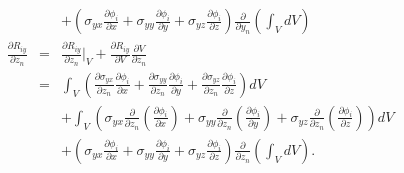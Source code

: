 \begin{eqnarray}
&& + \left(  \sigma_{yx} \frac{\partial \phi_i}{\partial x} + \sigma_{yy} \frac{\partial \phi_i}{\partial y} + \sigma_{yz} \frac{\partial \phi_i}{\partial z} \right) \frac{\partial}{\partial y_n} \left(\int_V dV \right) \nonumber\\
\frac{\partial R_{iy}}{\partial z_n} &=& \frac{\partial R_{iy}}{\partial z_n} \bigg |_V + \frac{\partial R_{iy}}{\partial V} \frac{\partial V}{\partial z_n} \nonumber\\
&=& \int_V \left(\frac{\partial \sigma_{yx}}{\partial z_n}\frac{\partial \phi_i}{\partial x} +\frac{\partial \sigma_{yy}}{\partial z_n} \frac{\partial \phi_i}{\partial y} + \frac{\partial \sigma_{yz}}{\partial z_n}\frac{\partial \phi_i}{\partial z}  \right) dV \nonumber\\
&&+ \int_V \left(\sigma_{yx} \frac{\partial}{\partial z_n} \left(\frac{\partial \phi_i}{\partial x}\right)+ \sigma_{yy} \frac{\partial}{\partial z_n} \left(\frac{\partial \phi_i}{\partial y}\right) + \sigma_{yz} \frac{\partial}{\partial z_n} \left(\frac{\partial \phi_i}{\partial z}\right) \right) dV \nonumber\\
&& + \left(  \sigma_{yx} \frac{\partial \phi_i}{\partial x} + \sigma_{yy} \frac{\partial \phi_i}{\partial y} + \sigma_{yz} \frac{\partial \phi_i}{\partial z} \right) \frac{\partial}{\partial z_n} \left(\int_V dV \right).
\label{dRy}
\end{eqnarray}
%


